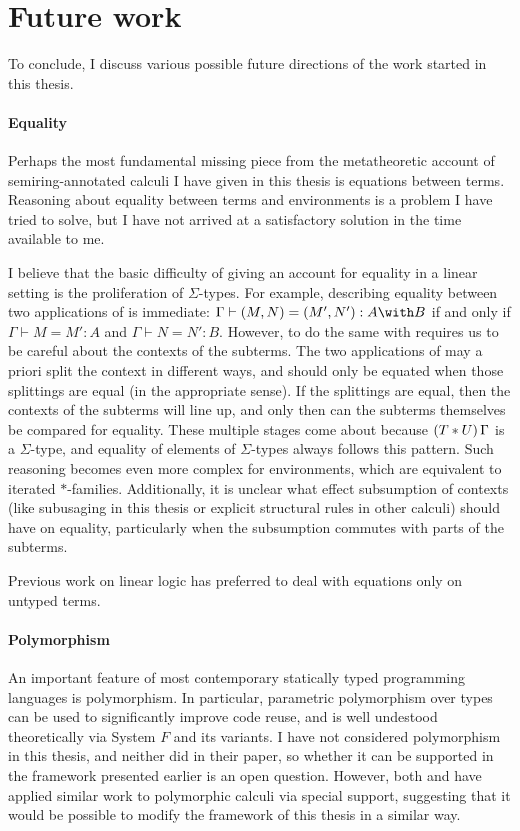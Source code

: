 \section{Future work}

To conclude, I discuss various possible future directions of the work started in
this thesis.

\paragraph{Equality}
Perhaps the most fundamental missing piece from the metatheoretic account of
semiring-annotated calculi I have given in this thesis is equations between
terms.
Reasoning about equality between terms and environments is a problem I have
tried to solve, but I have not arrived at a satisfactory solution in the time
available to me.

I believe that the basic difficulty of giving an account for equality in a
linear setting is the proliferation of $\Sigma$-types.
For example, describing equality between two applications of
 is immediate: $\Gamma \vdash (M, N) = (M', N') : A \with B$
if and only if $\Gamma \vdash M = M' : A$ and $\Gamma \vdash N = N' : B$.
However, to do the same with  requires us to be careful
about the contexts of the subterms.
The two applications of  may a priori split the context in
different ways, and should only be equated when those splittings are equal
(in the appropriate sense).
If the splittings are equal, then the contexts of the subterms will line up, and
only then can the subterms themselves be compared for equality.
These multiple stages come about because $\plr{T * U}\,\Gamma$ is a
$\Sigma$-type, and equality of elements of $\Sigma$-types always follows this
pattern.
Such reasoning becomes even more complex for environments, which are equivalent
to iterated $*$-families.
Additionally, it is unclear what effect subsumption of contexts (like subusaging
in this thesis or explicit structural rules in other calculi) should have on
equality, particularly when the subsumption commutes with parts of the subterms.

Previous work on linear logic has preferred to deal with equations only on
untyped terms. 

\paragraph{Polymorphism}
An important feature of most contemporary statically typed programming languages
is polymorphism.
In particular, parametric polymorphism over types can be used to significantly
improve code reuse, and is well undestood theoretically via System $F$ and its
variants.
I have not considered polymorphism in this thesis, and neither did
\citet{AACMM21} in their paper, so whether it can be supported in the framework
presented earlier is an open question.
However, both \citet{Autosubst15} and \citet{Autosubst18} have applied similar
work to polymorphic calculi via special support, suggesting that it would be
possible to modify the framework of this thesis in a similar way.

